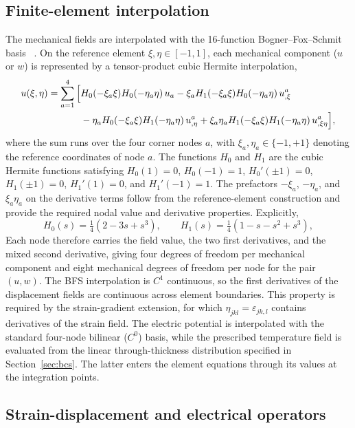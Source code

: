 \documentclass[pdflatex,sn-mathphys-num]{sn-jnl}
\begin{document}
\subsection{Finite-element interpolation}
\label{sec:discretization}

The mechanical fields are interpolated with the 16-function Bogner--Fox--Schmit
basis ~\cite{Bogner1965}. On the reference element
$\xi,\eta\in[-1,1]$, each mechanical component ($u$ or $w$) is represented by a
tensor-product cubic Hermite interpolation,
\begin{align}
u(\xi,\eta)=\sum_{a=1}^{4}\Big[&
H_0(-\xi_a\xi)H_0(-\eta_a\eta)\,u_a
-\xi_aH_1(-\xi_a\xi)H_0(-\eta_a\eta)\,u_{,\xi}^a\notag\\
&-\eta_aH_0(-\xi_a\xi)H_1(-\eta_a\eta)\,u_{,\eta}^a
+\xi_a\eta_aH_1(-\xi_a\xi)H_1(-\eta_a\eta)\,u_{,\xi\eta}^a\Big],
\label{eq:bfs-interp}
\end{align}
where the sum runs over the four corner nodes $a$, with
$\xi_a,\eta_a\in\{-1,+1\}$ denoting the reference coordinates of node $a$.
The functions $H_0$ and $H_1$ are the cubic Hermite functions satisfying
$H_0(1)=0$, $H_0(-1)=1$, $H_0'(\pm1)=0$,
$H_1(\pm1)=0$, $H_1'(1)=0$, and $H_1'(-1)=1$. The prefactors
$-\xi_a$, $-\eta_a$, and $\xi_a\eta_a$ on the derivative terms follow from the
reference-element construction and provide the required nodal value and derivative
properties. Explicitly,
\begin{equation}
H_0(s)=\tfrac14(2-3s+s^3),\qquad
H_1(s)=\tfrac14(1-s-s^2+s^3),
\label{eq:hermite}
\end{equation}
Each node therefore carries the field value, the two first derivatives, and the mixed
second derivative, giving four degrees of freedom per mechanical component and eight
mechanical degrees of freedom per node for the pair $(u,w)$. The BFS interpolation is
$C^1$ continuous, so the first derivatives of the displacement fields are continuous
across element boundaries. This property is required by the strain-gradient extension,
for which $\eta_{jkl}=\varepsilon_{jk,l}$ contains derivatives of the strain field.
The electric potential is interpolated with the standard four-node bilinear ($C^0$)
basis, while the prescribed temperature field is evaluated from the linear
through-thickness distribution specified in Section~\ref{sec:bcs}. The latter enters
the element equations through its values at the integration points.

\subsection{Strain-displacement and electrical operators}
\label{sec:Bops}
\end{document}
